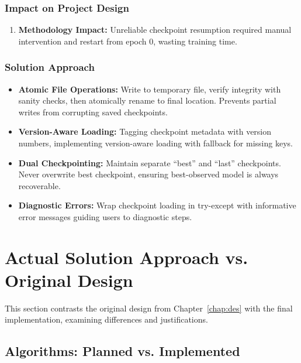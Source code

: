 \subsubsection{Impact on Project Design}

\begin{enumerate}
    \item \textbf{Methodology Impact:} Unreliable checkpoint resumption required manual intervention and restart from epoch 0, wasting training time.
\end{enumerate}

\subsubsection{Solution Approach}

\begin{itemize}
    \item \textbf{Atomic File Operations:} Write to temporary file, verify integrity with sanity checks, then atomically rename to final location. Prevents partial writes from corrupting saved checkpoints.
    
    \item \textbf{Version-Aware Loading:} Tagging checkpoint metadata with version numbers, implementing version-aware loading with fallback for missing keys.
    
    \item \textbf{Dual Checkpointing:} Maintain separate ``best'' and ``last'' checkpoints. Never overwrite best checkpoint, ensuring best-observed model is always recoverable.
    
    \item \textbf{Diagnostic Errors:} Wrap checkpoint loading in try-except with informative error messages guiding users to diagnostic steps.
\end{itemize}

\section{Actual Solution Approach vs. Original Design}

This section contrasts the original design from Chapter~\ref{chap:des} with the final implementation, examining differences and justifications.

\subsection{Algorithms: Planned vs. Implemented}

